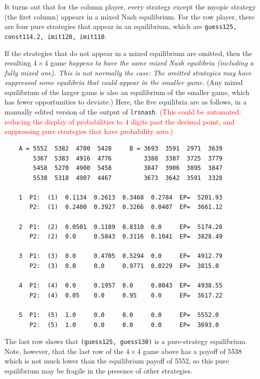 \documentclass[a4paper,12pt]{article}  %
\def\R{\textcolor{red}}
\theoremstyle{definition}
\begin{document}
It turns out that for the column player, every strategy
except the myopic strategy (the first column) appears in a
mixed Nash equilibrium.
For the row player, there are four pure strategies that appear in
an equilibrium, which are
{\tt guess125,  const114.2, imit120, imit110}.

If the strategies that do not appear in a mixed equilibrium
are omitted, then the resulting $4\times4$ game
\textit{happens to have the same mixed Nash equilibria
(including a fully mixed one). This is not normally the
case: The omitted strategies may have suppressed some
equilibria that could appear in the smaller game.}
(Any mixed equilibrium of the larger game is also an
equilibrium of the smaller game, which has fewer
opportunities to deviate.)
Here, the five equilibria are as follows, in a manually
edited version of the output of {\tt lrsnash}.
\R{(This could be automated: reducing the display of
probabilities to 4 digits past the decimal point, and
suppressing pure strategies that have probability zero.)}

\begin{verbatim}
    A = 5552  5382  4700  5428     B = 3693  3591  2971  3639
        5367  5383  4916  4776         3388  3387  3725  3779
        5458  5270  4900  5458         3847  3906  3895  3847
        5538  5318  4907  4467         3673  3642  3591  3328

    1  P1:  (1)  0.1134  0.2613  0.3468  0.2784  EP=  5201.93
       P2:  (1)  0.2400  0.3927  0.3266  0.0407  EP=  3661.12

    2  P1:  (2)  0.0501  0.1189  0.8310  0.0     EP=  5174.28
       P2:  (2)  0.0     0.5843  0.3116  0.1041  EP=  3828.49

    3  P1:  (3)  0.0     0.4705  0.5294  0.0     EP=  4912.79
       P2:  (3)  0.0     0.0     0.9771  0.0229  EP=  3815.0

    4  P1:  (4)  0.0     0.1957  0.0     0.8043  EP=  4938.55
       P2:  (4)  0.05    0.0     0.95    0.0     EP=  3617.22

    5  P1:  (5)  1.0     0.0     0.0     0.0     EP=  5552.0
       P2:  (5)  1.0     0.0     0.0     0.0     EP=  3693.0 
\end{verbatim}
The last row shows that {\tt(guess125, guess130)} is a
pure-strategy equilibrium.
Note, however, that the last row of the $4\times 4$ game
above has a payoff of 5538 which is not much lower than the
equilibrium payoff of 5552, so this pure equilibrium may be
fragile in the presence of other strategies.
\end{document}
